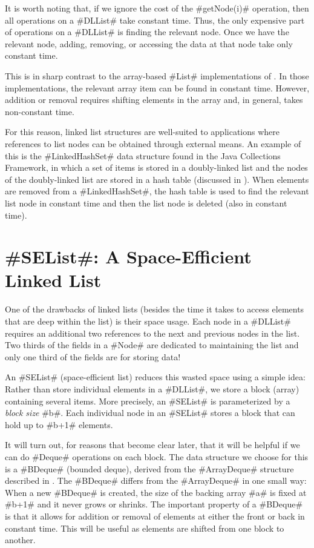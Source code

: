 It is worth noting that, if we ignore the cost of the #getNode(i)#
operation, then all operations on a #DLList# take constant time.
Thus, the only expensive part of operations on a #DLList# is finding
the relevant node.  Once we have the relevant node, adding, removing,
or accessing the data at that node take only constant time.

This is in sharp contrast to the array-based #List# implementations of
. In those implementations, the relevant array
item can be found in constant time. However, addition or removal requires
shifting elements in the array and, in general, takes non-constant time.

For this reason, linked list structures are well-suited to applications
where references to list nodes can be obtained through external means.
An example of this is the #LinkedHashSet# data structure found in the
Java Collections Framework, in which a set of items is stored in a
doubly-linked list and the nodes of the doubly-linked list are stored
in a hash table (discussed in ).  When elements
are removed from a #LinkedHashSet#, the hash table is used to find the
relevant list node in constant time and then the list node is deleted
(also in constant time).


\section{#SEList#: A Space-Efficient Linked List}

One of the drawbacks of linked lists (besides the time it takes to
access elements that are deep within the list) is their space usage.
Each node in a #DLList# requires an additional two references to the next
and previous nodes in the list.  Two thirds of the fields in a #Node#
are dedicated to maintaining the list and only one third of the fields
are for storing data!

An #SEList# (space-efficient list) reduces this wasted space using
a simple idea: Rather than store individual elements in a #DLList#,
we store a block (array) containing several items. More precisely, an
#SEList# is parameterized by a \emph{block size} #b#. Each individual
node in an #SEList# stores a block that can hold up to #b+1# elements.

It will turn out, for reasons that become clear later, that it will
be helpful if we can do #Deque# operations on each block.  The data
structure we choose for this is a #BDeque# (bounded deque), derived
from the #ArrayDeque# structure described in .
The #BDeque# differs from the #ArrayDeque# in one small way: When a
new #BDeque# is created, the size of the backing array #a#
is fixed at #b+1# and it never grows or shrinks.
The important property of a #BDeque# is that it allows for addition or
removal of elements at either the front or back in constant time. This
will be useful as elements are shifted from one block to another.


